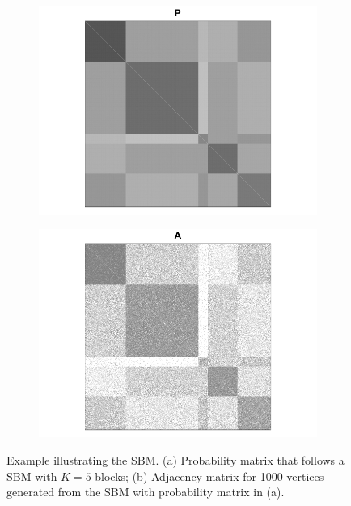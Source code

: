 \documentclass[a4paper]{article}
\begin{document}
\begin{figure}
\centering
\begin{subfigure}{.5\textwidth}
  \centering
  \includegraphics[width=1.2\linewidth]{SBM_P.png}
\end{subfigure}%
\begin{subfigure}{.5\textwidth}
  \centering
  \includegraphics[width=1.2\linewidth]{SBM_A.png}
\end{subfigure}
\caption{Example illustrating the SBM. (a) Probability matrix that follows a SBM with $K = 5$ blocks; (b) Adjacency matrix for 1000 vertices generated from the SBM with probability matrix in (a).}
\label{fig:SBM_example}
\end{figure}
\end{document}
